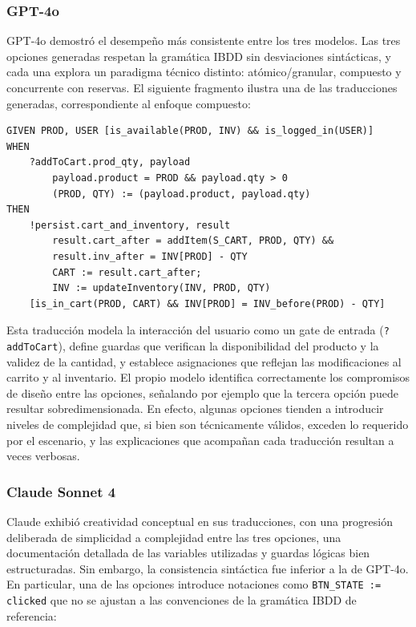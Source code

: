 \subsubsection{GPT-4o}

GPT-4o demostró el desempeño más consistente entre los tres modelos. Las tres opciones generadas respetan la gramática IBDD sin desviaciones sintácticas, y cada una explora un paradigma técnico distinto: atómico/granular, compuesto y concurrente con reservas. El siguiente fragmento ilustra una de las traducciones generadas, correspondiente al enfoque compuesto:

\noindent\begin{minipage}{\linewidth}
\begin{lstlisting}
GIVEN PROD, USER [is_available(PROD, INV) && is_logged_in(USER)]
WHEN
    ?addToCart.prod_qty, payload
        payload.product = PROD && payload.qty > 0
        (PROD, QTY) := (payload.product, payload.qty)
THEN
    !persist.cart_and_inventory, result
        result.cart_after = addItem(S_CART, PROD, QTY) &&
        result.inv_after = INV[PROD] - QTY
        CART := result.cart_after;
        INV := updateInventory(INV, PROD, QTY)
    [is_in_cart(PROD, CART) && INV[PROD] = INV_before(PROD) - QTY]
\end{lstlisting}
\end{minipage}

Esta traducción modela la interacción del usuario como un gate de entrada (\texttt{?addToCart}), define guardas que verifican la disponibilidad del producto y la validez de la cantidad, y establece asignaciones que reflejan las modificaciones al carrito y al inventario. El propio modelo identifica correctamente los compromisos de diseño entre las opciones, señalando por ejemplo que la tercera opción puede resultar sobredimensionada. En efecto, algunas opciones tienden a introducir niveles de complejidad que, si bien son técnicamente válidos, exceden lo requerido por el escenario, y las explicaciones que acompañan cada traducción resultan a veces verbosas.

\subsubsection{Claude Sonnet 4}

Claude exhibió creatividad conceptual en sus traducciones, con una progresión deliberada de simplicidad a complejidad entre las tres opciones, una documentación detallada de las variables utilizadas y guardas lógicas bien estructuradas. Sin embargo, la consistencia sintáctica fue inferior a la de GPT-4o. En particular, una de las opciones introduce notaciones como \texttt{BTN\_STATE := clicked} que no se ajustan a las convenciones de la gramática IBDD de referencia:

